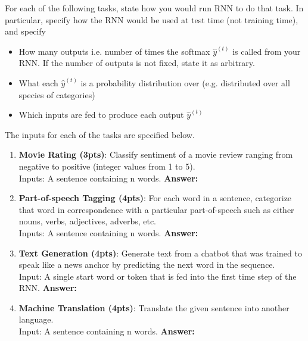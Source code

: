 \documentclass{assignment format}
\newenvironment{answer}{
    {\bf Answer:} \begingroup\color{red}
}{\endgroup}%
\begin{document}
For each of the following tasks, state how you would run RNN to do that task. In particular, specify how the RNN would be used at test time (not training time), and specify
\begin{itemize}
    \item How many outputs i.e. number of times the softmax $\hat{y}^{(t)}$ is called from your RNN. If the number of outputs is not fixed, state it as arbitrary.  
    \item What each $\hat{y}^{(t)}$ is a probability distribution over (e.g. distributed over all species of categories)
    \item Which inputs are fed to produce each output $\hat{y}^{(t)}$
    \end{itemize}
The inputs for each of the tasks are specified below.
\begin{enumerate}[label=(\alph*)]
    \item \textbf{Movie Rating (3pts)}: Classify sentiment of a movie review ranging from negative to positive (integer values from 1 to 5).\\Inputs: A sentence
    containing n words.
    \begin{answer}
    \end{answer}
    \item \textbf{Part-of-speech Tagging (4pts)}: For each word in a sentence, categorize that word in correspondence with a particular part-of-speech such as either nouns, verbs, adjectives, adverbs, etc.\\Inputs: A sentence containing n words.
    \begin{answer}
    \end{answer}
    \item \textbf{Text Generation (4pts)}: Generate text from a chatbot that was trained to speak like a news anchor by predicting the next word in the sequence. \\Input: A single start word or token that is fed into the first time step of the RNN.
    \begin{answer}
    \end{answer}
    \item \textbf{Machine Translation (4pts)}: Translate the given sentence into another language. \\Input: A sentence containing n words. 
    \begin{answer}
    \end{answer}
    \end{enumerate}
    
\end{document}
